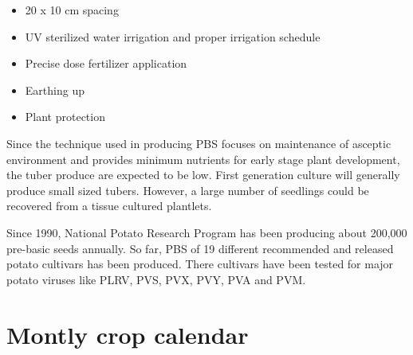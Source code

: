 \documentclass[
]{book}
\providecommand{\tightlist}{%
  \setlength{\itemsep}{0pt}\setlength{\parskip}{0pt}}
\begin{document}
\begin{itemize}
  \begin{itemize}
  \tightlist
  \item
    20 x 10 cm spacing
  \item
    UV sterilized water irrigation and proper irrigation schedule
  \item
    Precise dose fertilizer application
  \item
    Earthing up
  \item
    Plant protection
  \end{itemize}
\end{itemize}

Since the technique used in producing PBS focuses on maintenance of asceptic environment and provides minimum nutrients for early stage plant development, the tuber produce are expected to be low. First generation culture will generally produce small sized tubers. However, a large number of seedlings could be recovered from a tissue cultured plantlets.

Since 1990, National Potato Research Program has been producing about 200,000 pre-basic seeds annually. So far, PBS of 19 different recommended and released potato cultivars has been produced. There cultivars have been tested for major potato viruses like PLRV, PVS, PVX, PVY, PVA and PVM.

\hypertarget{montly-crop-calendar}{%
\section{Montly crop calendar}\label{montly-crop-calendar}}
\end{document}
